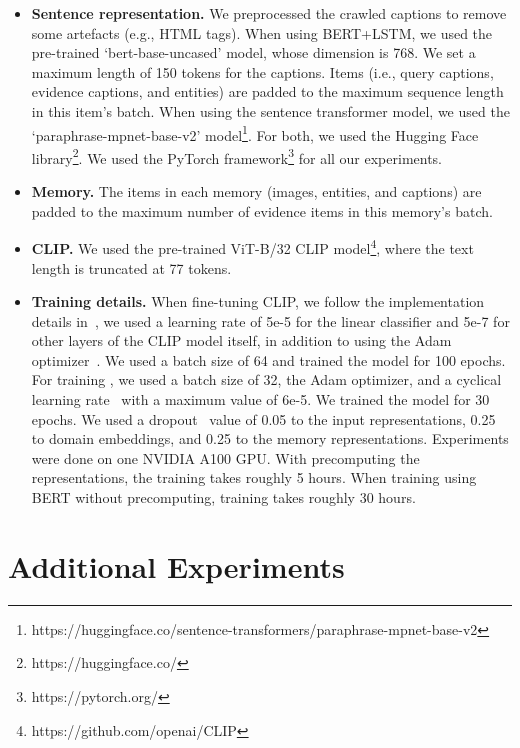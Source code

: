 \begin{itemize}

\item \textbf{Sentence representation.}
We preprocessed the crawled captions to remove some artefacts (e.g., HTML tags). When using BERT+LSTM, we used the pre-trained `bert-base-uncased' model, whose dimension is 768. We set a maximum length of 150 tokens for the captions. Items (i.e., query captions, evidence captions, and entities) are padded to the maximum sequence length in this item's batch. When using the sentence transformer model, we used the `paraphrase-mpnet-base-v2' model\footnote{https://huggingface.co/sentence-transformers/paraphrase-mpnet-base-v2}. For both, we used the Hugging Face library\footnote{https://huggingface.co/}. We used the PyTorch framework\footnote{https://pytorch.org/} for all our experiments.

\item \textbf{Memory.}
The items in each memory (images, entities, and captions) are padded to the maximum number of evidence items in this memory's batch.

\item \textbf{CLIP.}
We used the pre-trained ViT-B/32 CLIP model\footnote{https://github.com/openai/CLIP}, where the text length is truncated at 77 tokens.

\item \textbf{Training details.}
When fine-tuning CLIP, we follow the implementation details in~\cite{luo2021newsclippings}, we used a learning rate of 5e-5 for
the linear classifier and 5e-7 for other layers of the CLIP model itself, in addition to using the Adam optimizer~\cite{kingma2014adam}. We used a batch size of 64 and trained the model for 100 epochs. For training \model{}, we used a batch size of 32, the Adam optimizer, and a cyclical learning rate~\cite{smith2017cyclical} with a maximum value of 6e-5. We trained the model for 30 epochs. We used a dropout~\cite{srivastava2014dropout} value of 0.05 to the input representations, 0.25 to domain embeddings, and 0.25 to the memory representations. Experiments were done on one NVIDIA A100 GPU. With precomputing the representations, the training takes roughly 5 hours. When training using BERT without precomputing, training takes roughly 30 hours.

\end{itemize}
\section{Additional Experiments} \label{sec:add_exp}

